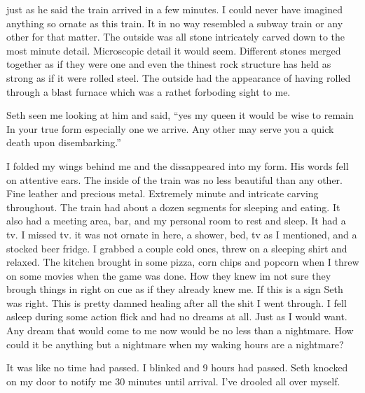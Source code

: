 just as he said the train arrived in a few minutes. I could never have imagined anything so ornate as this train. It in no way resembled a subway train or any other for that matter. The outside was all stone intricately carved down to the most minute detail. Microscopic detail it would seem. Different stones merged together as if they were one and even the thinest rock structure has held as strong as if it were rolled steel. The outside had the appearance of having rolled through a blast furnace which was a rathet forboding sight to me.

Seth seen me looking at him and said, ``yes my queen it would be wise to remain In your true form especially one we arrive. Any other may serve you a quick death upon disembarking.''

I folded my wings behind me and the dissappeared into my form. His words fell on attentive ears. The inside of the train was no less beautiful than any other. Fine leather and precious metal. Extremely minute and intricate carving throughout. The train had about a dozen segments for sleeping and eating. It also had a meeting area, bar, and my personal room to rest and sleep. It had a tv. I missed tv. it was not ornate in here, a shower, bed, tv as I mentioned, and a stocked beer fridge. I grabbed a couple cold ones, threw on a sleeping shirt and relaxed. The kitchen brought in some pizza, corn chips and popcorn when I threw on some movies when the game was done. How they knew im not sure they brough things in right on cue as if they already knew me. If this is a sign Seth was right. This is pretty damned healing after all the shit I went through. I fell asleep during some action flick and had no dreams at all. Just as I would want. Any dream that would come to me now would be no less than a nightmare. How could it be anything but a nightmare when my waking hours are a nightmare?

It was like no time had passed. I blinked and 9 hours had passed. Seth knocked on my door to notify me 30 minutes until arrival. I've drooled all over myself.



 